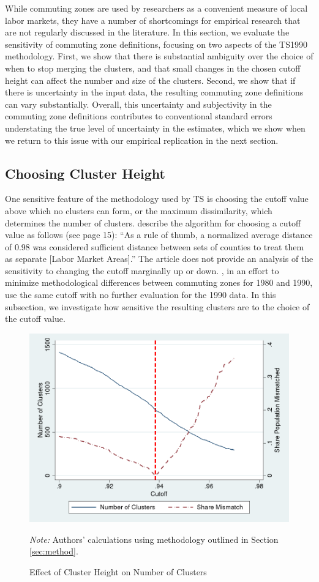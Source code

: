 While commuting zones are used by researchers as a convenient measure of local labor markets, they have a number of shortcomings for empirical research that are not regularly discussed in the literature. In this section, we evaluate the sensitivity of commuting zone definitions, focusing on two aspects of the TS1990 methodology. First, we show that there is substantial ambiguity over the choice of when to stop merging the clusters, and that small changes in the chosen cutoff height can affect the number and size of the clusters. Second, we show that if there is uncertainty in the input data, the resulting commuting zone definitions can vary substantially. Overall, this uncertainty and subjectivity in the commuting zone definitions contributes to conventional standard errors understating the true level of uncertainty in the estimates, which we show when we return to this issue with our empirical replication in the next section.

\subsection{Choosing Cluster Height}
\FloatBarrier
One sensitive feature of the methodology used by TS is choosing the cutoff value above which no clusters can form, or the maximum dissimilarity, which determines the number of clusters. \cite{TK1987} describe the algorithm for choosing a cutoff value as follows (see page 15): ``As a rule of thumb, a normalized average distance of 0.98 was considered sufficient distance between sets of counties to treat them as separate [Labor Market Areas].'' The article does not provide an analysis of the sensitivity to changing the cutoff marginally up or down. \cite{TS1996}, in an effort to minimize methodological differences between commuting zones for 1980 and 1990, use the same cutoff with no further evaluation for the 1990 data. In this subsection, we investigate how sensitive the resulting clusters are to the choice of the cutoff value.

\begin{figure}
\includegraphics[scale=0.25]{./figures/numclus_cutoff.png}
\caption{Effect of Cluster Height on Number of Clusters \label{fig:cutoff_count}}
\emph{Note:} Authors' calculations using methodology outlined in Section \ref{sec:method}.
\end{figure}

